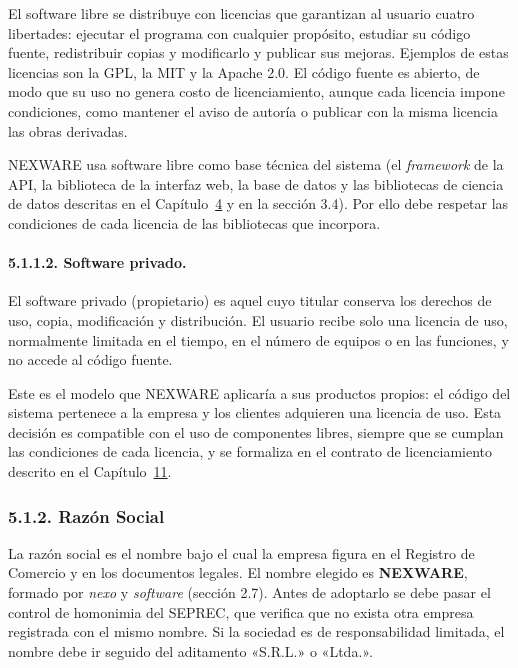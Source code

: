El software libre se distribuye con licencias que garantizan al usuario cuatro libertades: ejecutar el programa con cualquier propósito, estudiar su código fuente, redistribuir copias y modificarlo y publicar sus mejoras. Ejemplos de estas licencias son la GPL, la MIT y la Apache 2.0. El código fuente es abierto, de modo que su uso no genera costo de licenciamiento, aunque cada licencia impone condiciones, como mantener el aviso de autoría o publicar con la misma licencia las obras derivadas.

NEXWARE usa software libre como base técnica del sistema (el \textit{framework} de la API, la biblioteca de la interfaz web, la base de datos y las bibliotecas de ciencia de datos descritas en el Capítulo~\hyperref[cap:case]{4} y en la sección 3.4). Por ello debe respetar las condiciones de cada licencia de las bibliotecas que incorpora.

\paragraph{5.1.1.2. Software privado.}

El software privado (propietario) es aquel cuyo titular conserva los derechos de uso, copia, modificación y distribución. El usuario recibe solo una licencia de uso, normalmente limitada en el tiempo, en el número de equipos o en las funciones, y no accede al código fuente.

Este es el modelo que NEXWARE aplicaría a sus productos propios: el código del sistema pertenece a la empresa y los clientes adquieren una licencia de uso. Esta decisión es compatible con el uso de componentes libres, siempre que se cumplan las condiciones de cada licencia, y se formaliza en el contrato de licenciamiento descrito en el Capítulo~\hyperref[cap:puesta_marcha]{11}.

\subsubsection{5.1.2. Razón Social}

La razón social es el nombre bajo el cual la empresa figura en el Registro de Comercio y en los documentos legales. El nombre elegido es \textbf{NEXWARE}, formado por \textit{nexo} y \textit{software} (sección 2.7). Antes de adoptarlo se debe pasar el control de homonimia del SEPREC, que verifica que no exista otra empresa registrada con el mismo nombre. Si la sociedad es de responsabilidad limitada, el nombre debe ir seguido del aditamento «S.R.L.» o «Ltda.».

